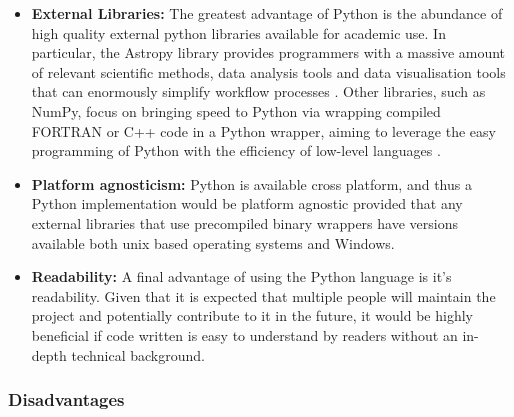 \documentclass[titlesmallcaps, examinerscopy, copyrightpage]{uqthesis}
\begin{document}
\begin{itemize}
\item \textbf{External Libraries:} The greatest advantage of Python is the abundance of  high quality external python libraries available for academic use. In particular, the Astropy library provides programmers with a massive amount of relevant scientific methods, data analysis tools and data visualisation tools that can enormously simplify workflow processes \cite{astropy}. Other libraries, such as NumPy, focus on bringing speed to Python via wrapping compiled FORTRAN or C++ code in a Python wrapper, aiming to leverage the easy programming of Python with the efficiency of low-level languages \cite{numpy}.

\item \textbf{Platform agnosticism:} Python is available cross platform, and thus a Python implementation would be platform agnostic provided that any external libraries that use precompiled binary wrappers have versions available both unix based operating systems and Windows.

\item \textbf{Readability:} A final advantage of using the Python language is it's readability. Given that it is expected that multiple people will maintain the project and potentially contribute to it in the future, it would be highly beneficial if code written is easy to understand by readers without an in-depth technical background.
\end{itemize}
  

\subsubsection{Disadvantages}
\end{document}
